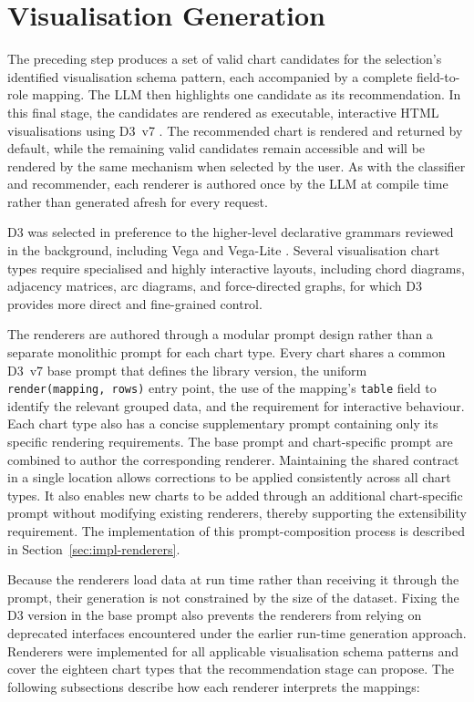\section{Visualisation Generation}
\label{sec:step3}

The preceding step produces a set of valid chart candidates for the selection's identified visualisation schema pattern, each accompanied by a complete field-to-role mapping. The LLM then highlights one candidate as its recommendation. In this final stage, the candidates are rendered as executable, interactive HTML visualisations using D3~v7 \cite{bostock2011d3}. The recommended chart is rendered and returned by default, while the remaining valid candidates remain accessible and will be rendered by the same mechanism when selected by the user. As with the classifier and recommender, each renderer is authored once by the LLM at compile time rather than generated afresh for every request.

D3 was selected in preference to the higher-level declarative grammars reviewed in the background, including Vega and Vega-Lite \cite{satyanarayan2016vega,vega2025}. Several visualisation chart types require specialised and highly interactive layouts, including chord diagrams, adjacency matrices, arc diagrams, and force-directed graphs, for which D3 provides more direct and fine-grained control. %

The renderers are authored through a modular prompt design rather than a separate monolithic prompt for each chart type. Every chart shares a common D3~v7 base prompt that defines the library version, the uniform \texttt{render(mapping, rows)} entry point, the use of the mapping's \texttt{table} field to identify the relevant grouped data, and the requirement for interactive behaviour. Each chart type also has a concise supplementary prompt containing only its specific rendering requirements. The base prompt and chart-specific prompt are combined to author the corresponding renderer. Maintaining the shared contract in a single location allows corrections to be applied consistently across all chart types. It also enables new charts to be added through an additional chart-specific prompt without modifying existing renderers, thereby supporting the extensibility requirement. The implementation of this prompt-composition process is described in Section~\ref{sec:impl-renderers}.

Because the renderers load data at run time rather than receiving it through the prompt, their generation is not constrained by the size of the dataset. Fixing the D3 version in the base prompt also prevents the renderers from relying on deprecated interfaces encountered under the earlier run-time generation approach. Renderers were implemented for all applicable visualisation schema patterns and cover the eighteen chart types that the recommendation stage can propose. The following subsections describe how each renderer interprets the mappings:

